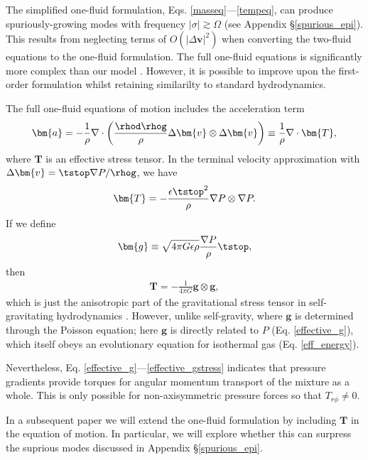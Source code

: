 The simplified one-fluid formulation,
Eqs. \ref{masseq}---\ref{tempeq}, can 
produce spuriously-growing modes with frequency $|\sigma|\gtrsim
\Omega$ (see Appendix \S\ref{spurious_epi}). This 
results from neglecting terms of $O(|\Delta\bm{v}|^2)$ when converting
the two-fluid equations to the one-fluid formulation. The full
one-fluid equations is significantly more complex than our 
model \cite[e.g.][]{laibe14}. However, it is possible to improve upon
the first-order formulation whilst retaining similarilty to  
standard hydrodynamics.  

The full one-fluid equations of motion includes the acceleration term 
\begin{align}
\bm{a} =  
-\frac{1}{\rho}\nabla\cdot\left(\frac{\rhod\rhog}{\rho}\Delta\bm{v}\otimes\Delta\bm{v}\right) 
\equiv  \frac{1}{\rho}\nabla\cdot \bm{T},
\end{align}
where $\bm{T}$ is an effective stress tensor. 
In the terminal velocity approximation with $\Delta\bm{v} = \tstop
\nabla P/\rhog$, we have 
\begin{align}
\bm{T} = - \frac{\epsilon\tstop^2}{\rho}\nabla P \otimes \nabla P.
\end{align}
If we define 
\begin{align}
  \bm{g} \equiv \sqrt{4\pi G \epsilon \rho} \frac{\nabla P}{\rho}
  \tstop,\label{effective_g} 
\end{align}
then
\begin{align}
\bm{T} = - \frac{1}{4\pi G} \bm{g}\otimes\bm{g}, \label{effective_gstress}
\end{align}
which is just the anisotropic part of the  
gravitational stress tensor in self-gravitating hydrodynamics 
\citep{lynden-bell72}. However, unlike self-gravity, where $\bm{g}$ is
determined through the Poisson equation; here $\bm{g}$ is directly
related to $P$ (Eq. \ref{effective_g}), which itself obeys an 
evolutionary equation for isothermal gas (Eq. \ref{eff_energy}).  

Nevertheless, Eq. \ref{effective_g}---\ref{effective_gstress}
indicates that pressure gradients provide torques for angular momentum
transport of the mixture as a whole. This is only possible for
non-axisymmetric pressure forces so that $T_{r\phi}\neq0$.   

In a subsequent paper we will extend the one-fluid formulation by
including $\bm{T}$ in the equation of motion. 
In particular, we will explore whether this can surpress the suprious
modes discussed in Appendix \S\ref{spurious_epi}. 

